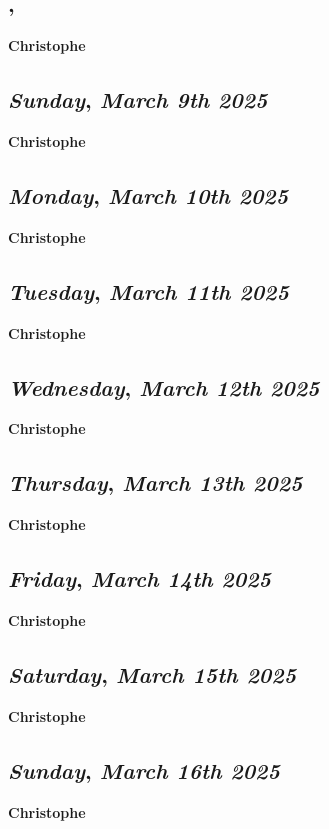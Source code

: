 \subsection*{\weekday, \day}
\textbf {Christophe}

\def\day{\textit{March 9th 2025}}
\def\weekday{\textit{Sunday}}
\subsection*{\weekday, \day}
\textbf {Christophe}

\def\day{\textit{March 10th 2025}}
\def\weekday{\textit{Monday}}
\subsection*{\weekday, \day}
\textbf {Christophe}

\def\day{\textit{March 11th 2025}}
\def\weekday{\textit{Tuesday}}
\subsection*{\weekday, \day}
\textbf {Christophe}

\def\day{\textit{March 12th 2025}}
\def\weekday{\textit{Wednesday}}
\subsection*{\weekday, \day}
\textbf {Christophe}

\def\day{\textit{March 13th 2025}}
\def\weekday{\textit{Thursday}}
\subsection*{\weekday, \day}
\textbf {Christophe}

\def\day{\textit{March 14th 2025}}
\def\weekday{\textit{Friday}}
\subsection*{\weekday, \day}
\textbf {Christophe}

\def\day{\textit{March 15th 2025}}
\def\weekday{\textit{Saturday}}
\subsection*{\weekday, \day}
\textbf {Christophe}

\def\day{\textit{March 16th 2025}}
\def\weekday{\textit{Sunday}}
\subsection*{\weekday, \day}
\textbf {Christophe}

